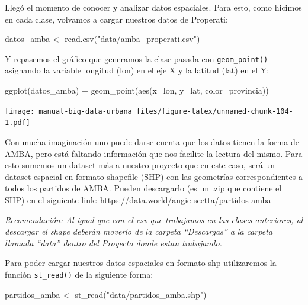 \documentclass[
  spanish,
]{book}
\newenvironment{Shaded}{\begin{snugshade}}{\end{snugshade}}
\newcommand{\AttributeTok}[1]{\textcolor[rgb]{0.77,0.63,0.00}{#1}}
\newcommand{\FunctionTok}[1]{\textcolor[rgb]{0.00,0.00,0.00}{#1}}
\newcommand{\NormalTok}[1]{#1}
\newcommand{\OtherTok}[1]{\textcolor[rgb]{0.56,0.35,0.01}{#1}}
\newcommand{\SpecialCharTok}[1]{\textcolor[rgb]{0.00,0.00,0.00}{#1}}
\newcommand{\StringTok}[1]{\textcolor[rgb]{0.31,0.60,0.02}{#1}}
\begin{document}
Llegó el momento de conocer y analizar datos espaciales. Para esto, como hicimos en cada clase, volvamos a cargar nuestros datos de Properati:

\begin{Shaded}
\begin{Highlighting}[]
\NormalTok{datos\_amba }\OtherTok{\textless{}{-}} \FunctionTok{read.csv}\NormalTok{(}\StringTok{"data/amba\_properati.csv"}\NormalTok{)}
\end{Highlighting}
\end{Shaded}

Y repasemos el gráfico que generamos la clase pasada con \texttt{geom\_point()} asignando la variable longitud (lon) en el eje X y la latitud (lat) en el Y:

\begin{Shaded}
\begin{Highlighting}[]
\FunctionTok{ggplot}\NormalTok{(datos\_amba) }\SpecialCharTok{+}
  \FunctionTok{geom\_point}\NormalTok{(}\FunctionTok{aes}\NormalTok{(}\AttributeTok{x=}\NormalTok{lon, }\AttributeTok{y=}\NormalTok{lat, }\AttributeTok{color=}\NormalTok{provincia))}
\end{Highlighting}
\end{Shaded}

\texttt{[image: manual-big-data-urbana\_files/figure-latex/unnamed-chunk-104-1.pdf]}

Con mucha imaginación uno puede darse cuenta que los datos tienen la forma de AMBA, pero está faltando información que nos facilite la lectura del mismo. Para esto sumemos un dataset más a nuestro proyecto que en este caso, será un dataset espacial en formato shapefile (SHP) con las geometrías correspondientes a todos los partidos de AMBA. Pueden descargarlo (es un .zip que contiene el SHP) en el siguiente link: \url{https://data.world/angie-scetta/partidos-amba}

\emph{Recomendación: Al igual que con el csv que trabajamos en las clases anteriores, al descargar el shape deberán moverlo de la carpeta ``Descargas'' a la carpeta llamada ``data'' dentro del Proyecto donde estan trabajando.}

Para poder cargar nuestros datos espaciales en formato shp utilizaremos la función \texttt{st\_read()} de la siguiente forma:

\begin{Shaded}
\begin{Highlighting}[]
\NormalTok{partidos\_amba }\OtherTok{\textless{}{-}} \FunctionTok{st\_read}\NormalTok{(}\StringTok{"data/partidos\_amba.shp"}\NormalTok{)}
\end{Highlighting}
\end{Shaded}
\end{document}
